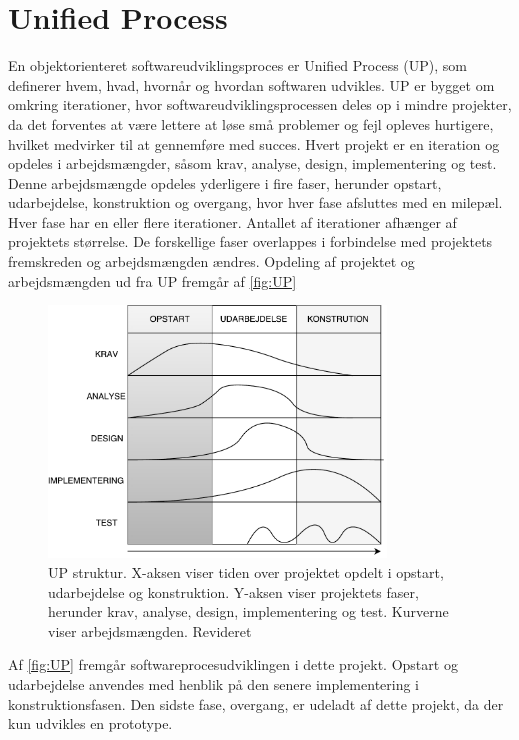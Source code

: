 \section{Unified Process}
En objektorienteret softwareudviklingsproces er Unified Process (UP), som definerer hvem, hvad, hvornår og hvordan softwaren udvikles. UP er bygget om omkring iterationer, hvor softwareudviklingsprocessen deles op i mindre projekter, da det forventes at være lettere at løse små problemer og fejl opleves hurtigere, hvilket medvirker til at gennemføre med succes. Hvert projekt er en iteration og opdeles i arbejdsmængder, såsom krav, analyse, design, implementering og test. Denne arbejdsmængde opdeles yderligere i fire faser, herunder opstart, udarbejdelse, konstruktion og overgang, hvor hver fase afsluttes med en milepæl. Hver fase har en eller flere iterationer. Antallet af iterationer afhænger af projektets størrelse. De forskellige faser overlappes i forbindelse med projektets fremskreden og arbejdsmængden ændres.\cite{Arlow2002} Opdeling af projektet og arbejdsmængden ud fra UP fremgår af \autoref{fig:UP}

\begin{figure} [H]
\centering
\includegraphics[width=0.8\textwidth]{figures/UP}
\caption{UP struktur. X-aksen viser tiden over projektet opdelt i opstart, udarbejdelse og konstruktion. Y-aksen viser projektets faser, herunder krav, analyse, design, implementering og test. Kurverne viser arbejdsmængden. Revideret \cite{Arlow2002}}
\label{fig:UP}
\end{figure} 

\noindent
Af \autoref{fig:UP} fremgår softwareprocesudviklingen i dette projekt. Opstart og udarbejdelse anvendes med henblik på den senere implementering i konstruktionsfasen. Den sidste fase, overgang, er udeladt af dette projekt, da der kun udvikles en prototype. 

